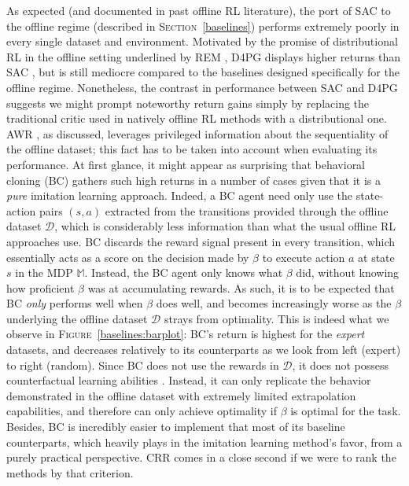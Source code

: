 As expected (and documented in past offline RL literature),
the port of
SAC \cite{Haarnoja2018-bm}
to the offline regime (described in \textsc{Section}~\ref{baselines})
performs extremely poorly in every single dataset and environment.
Motivated by the promise of distributional RL \cite{Bellemare2017-yr, Dabney2017-to, Dabney2018-ya, Dabney2020-nm}
in the offline setting underlined by REM \cite{Agarwal2020-eu},
D4PG \cite{Barth-Maron2018-ot}
displays higher returns than SAC \cite{Haarnoja2018-bm},
but is still mediocre compared to the baselines designed specifically for the offline regime.
Nonetheless, the contrast in performance between SAC and D4PG
suggests we might prompt noteworthy return gains simply by replacing the traditional critic used in
natively offline RL methods with a distributional one.
AWR \cite{Peng2019-hu}, as discussed, leverages privileged information about the sequentiality of the offline dataset;
this fact has to be taken into account when evaluating its performance.
At first glance, it might appear as surprising that behavioral cloning (BC) gathers such high returns
in a number of cases given that it is a
\emph{pure} imitation learning \cite{Bagnell2015-ni} approach.
Indeed, a BC agent need only use the state-action pairs $(s,a)$ extracted from the transitions provided through
the offline dataset $\mathcal{D}$, which is considerably less information than what the usual offline RL
approaches use.
BC discards the reward signal present in every transition,
which essentially acts as a score on the decision made by $\beta$ to execute action $a$ at state $s$
in the MDP $\mathbb{M}$.
Instead, the BC agent only knows what $\beta$ did, without knowing how proficient $\beta$ was
at accumulating rewards.
As such, it is to be expected that BC \emph{only} performs well when $\beta$ does well, and becomes
increasingly worse as the $\beta$ underlying the offline dataset $\mathcal{D}$ strays from optimality.
This is indeed what we observe in \textsc{Figure}~\ref{baselines:barplot}: BC's return is highest for
the \textit{expert} datasets, and decreases relatively to its counterparts as we look
from left (expert) to right (random).
Since BC does not use the rewards in $\mathcal{D}$,
it does not possess counterfactual learning abilities \cite{Bottou2013-so}.
Instead, it can only replicate the behavior demonstrated in the offline dataset with extremely limited extrapolation
capabilities,
and therefore can only achieve optimality if $\beta$ is optimal for the task.
Besides, BC is incredibly easier to implement that most of its baseline counterparts, which heavily plays in
the imitation learning method's favor, from a purely practical perspective.
CRR
comes in a close second if we were to rank the methods by that criterion.

